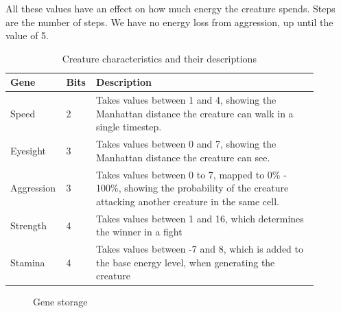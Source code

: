 \documentclass{article}
\begin{document}
All these values have an effect on how much energy the creature spends. Steps are the number of steps. We have no energy loss from aggression, up until the value of 5.

\begin{table}[H]
\begin{center}
    \begin{tabular}{|p{0.11\linewidth} |p{0.08\linewidth}|p{0.7\linewidth}|}
    \hline
    Gene & Bits & Description  \\\hline
    Speed & 2 & Takes values between 1 and 4, showing the Manhattan distance the creature can walk in a single timestep.\\\hline
    Eyesight & 3 & Takes values between 0 and 7, showing the Manhattan distance the creature can see.\\\hline
    Aggression & 3 & Takes values between 0 to 7, mapped to 0\% - 100\%, showing the probability of the creature attacking another creature in the same cell. \\\hline
    Strength & 4 & Takes values between 1 and 16, which determines the winner in a fight \\\hline
    Stamina & 4 & Takes values between -7 and 8, which is added to the base energy level, when generating the creature\\\hline
\end{tabular}
\caption{Creature characteristics and their descriptions}
\end{center}
\end{table}
\begin{figure}[!h]
\begin{center}
\caption{Gene storage}
\end{center}
\end{figure}
\end{document}
